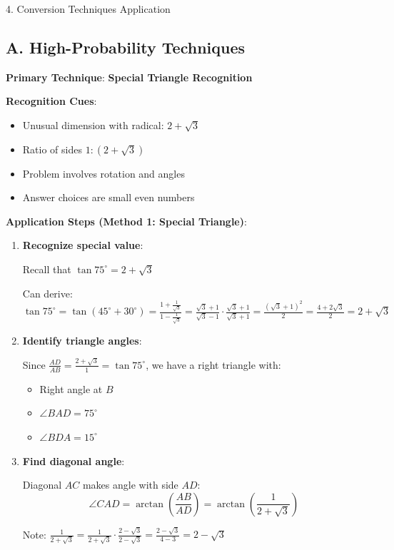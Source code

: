 \documentclass[12pt]{article}
\begin{document}
\begin{conversionbox}{4. Conversion Techniques Application}

\subsection*{A. High-Probability Techniques}

\textbf{Primary Technique}: \textbf{Special Triangle Recognition}

\textbf{Recognition Cues}:
\begin{itemize}
    \item Unusual dimension with radical: $2+\sqrt{3}$
    \item Ratio of sides $1:(2+\sqrt{3})$
    \item Problem involves rotation and angles
    \item Answer choices are small even numbers
\end{itemize}

\textbf{Application Steps (Method 1: Special Triangle)}:
\begin{enumerate}
    \item \textbf{Recognize special value}:
    
    Recall that $\tan 75^\circ = 2 + \sqrt{3}$
    
    Can derive: $\tan 75^\circ = \tan(45^\circ + 30^\circ) = \frac{1 + \frac{1}{\sqrt{3}}}{1 - \frac{1}{\sqrt{3}}} = \frac{\sqrt{3}+1}{\sqrt{3}-1} \cdot \frac{\sqrt{3}+1}{\sqrt{3}+1} = \frac{(\sqrt{3}+1)^2}{2} = \frac{4+2\sqrt{3}}{2} = 2+\sqrt{3}$
    
    \item \textbf{Identify triangle angles}:
    
    Since $\frac{AD}{AB} = \frac{2+\sqrt{3}}{1} = \tan 75^\circ$, we have a right triangle with:
    \begin{itemize}
        \item Right angle at $B$
        \item $\angle BAD = 75^\circ$
        \item $\angle BDA = 15^\circ$
    \end{itemize}
    
    \item \textbf{Find diagonal angle}:
    
    Diagonal $AC$ makes angle with side $AD$:
    \[\angle CAD = \arctan\left(\frac{AB}{AD}\right) = \arctan\left(\frac{1}{2+\sqrt{3}}\right)\]
    
    Note: $\frac{1}{2+\sqrt{3}} = \frac{1}{2+\sqrt{3}} \cdot \frac{2-\sqrt{3}}{2-\sqrt{3}} = \frac{2-\sqrt{3}}{4-3} = 2-\sqrt{3}$
    

\end{enumerate}
\end{conversionbox}
\end{document}
